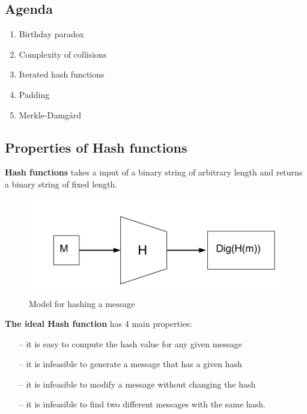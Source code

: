 

\subsection*{Agenda}
\begin{enumerate}
\item Birthday paradox
\item Complexity of collisions
\item Iterated hash functions
\item Padding
\item Merkle-Damgård
\end{enumerate}
\subsection{Properties of Hash functions}

\textbf{Hash functions} takes a input of a binary string of arbitrary
length and returns a binary string of fixed length.
\begin{figure}[H]
  \begin{centering}
    \includegraphics[scale=0.4]{images/10-hash}
    \caption{Model for hashing a message}
  \end{centering}
\end{figure}

\textbf{The ideal Hash function} has 4 main properties:
\begin{itemize}
\item [--]it is easy to compute the hash value for any given message
\item [--]it is infeasible to generate a message that has a given hash
\item [--]it is infeasible to modify a message without changing the hash
\item [--]it is infeasible to find two different messages with the same hash.
\end{itemize}


